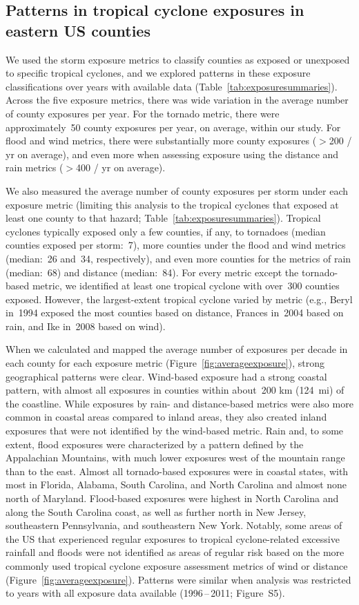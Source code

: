 \subsection*{Patterns in tropical cyclone exposures in eastern \ac{US} counties}

We used the storm exposure metrics to classify counties as exposed or unexposed
to specific tropical cyclones, and we explored patterns in these exposure
classifications over years with available data
(Table~\ref{tab:exposuresummaries}). Across the five exposure metrics, there
was wide variation in the average number of county exposures per year. For the
tornado metric, there were approximately~50 county exposures per
year, on average, within our study.  For flood and wind metrics, there were
substantially more county exposures ($>$200 / yr on average), and
even more when assessing exposure using the distance and rain metrics ($>$400 /
yr on average). 

We also measured the average number of county exposures per storm under each
exposure metric (limiting this analysis to the tropical cyclones that exposed
at least one county to that hazard; Table~\ref{tab:exposuresummaries}).
Tropical cyclones typically exposed only a few counties, if any, to tornadoes
(median counties exposed per storm:~7), more counties under the flood and wind
metrics (median:~26 and~34, respectively), and even more counties for the
metrics of rain (median:~68) and distance (median:~84).  For every metric
except the tornado-based metric, we identified at least one tropical cyclone
with over~300 counties exposed.  However, the largest-extent tropical cyclone
varied by metric (e.g., Beryl in~1994 exposed the most counties based on
distance, Frances in~2004 based on rain, and Ike in~2008 based on wind).

When we calculated and mapped the average number of exposures per decade in
each county for each exposure metric (Figure~\ref{fig:averageexposure}), strong
geographical patterns were clear. Wind-based exposure had a strong coastal
pattern, with almost all exposures in counties within about~200
\si{\kilo\metre} (124~mi) of the coastline. While exposures by rain- and
distance-based metrics were also more common in coastal areas compared to
inland areas, they also created inland exposures that were not identified by
the wind-based metric. Rain and, to some extent, flood exposures were
characterized by a pattern defined by the Appalachian Mountains, with much
lower exposures west of the mountain range than to the east. Almost all
tornado-based exposures were in coastal states, with most in Florida, Alabama,
South Carolina, and North Carolina and almost none north of Maryland.
Flood-based exposures were highest in North Carolina and along the South
Carolina coast, as well as further north in New Jersey, southeastern
Pennsylvania, and southeastern New York. Notably, some areas of the \ac{US}
that experienced regular exposures to tropical cyclone-related excessive
rainfall and floods were not identified as areas of regular risk based on the
more commonly used tropical cyclone exposure assessment metrics of wind or
distance (Figure~\ref{fig:averageexposure}). Patterns were similar when
analysis was restricted to years with all exposure data available
(1996\,--\,2011; Figure~S5). 

